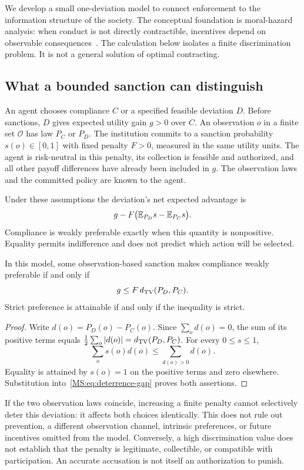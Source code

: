 We develop a small one-deviation model to connect enforcement to the information structure of the society. The conceptual foundation is moral-hazard analysis: when conduct is not directly contractible, incentives depend on observable consequences~\cite{MS:holmstrom1979}. The calculation below isolates a finite discrimination problem. It is not a general solution of optimal contracting.

\subsection{What a bounded sanction can distinguish}
An agent chooses compliance $C$ or a specified feasible deviation $D$. Before sanctions, $D$ gives expected utility gain $g>0$ over $C$. An observation $o$ in a finite set $\mathcal O$ has law $P_C$ or $P_D$. The institution commits to a sanction probability $s(o)\in[0,1]$ with fixed penalty $F>0$, measured in the same utility units. The agent is risk-neutral in this penalty, its collection is feasible and authorized, and all other payoff differences have already been included in $g$. The observation laws and the committed policy are known to the agent.

Under these assumptions the deviation's net expected advantage is
\begin{equation}\label{MS:eq:deterrence-gap}
g-F\bigl(\mathbb E_{P_D}s-\mathbb E_{P_C}s\bigr).
\end{equation}
Compliance is weakly preferable exactly when this quantity is nonpositive. Equality permits indifference and does not predict which action will be selected.

\begin{MSproposition}\label{MS:prop:deterrence-tv}
In this model, some observation-based sanction makes compliance weakly preferable if and only if
\[
g\leq F\,d_{\mathrm{TV}}(P_D,P_C).
\]
Strict preference is attainable if and only if the inequality is strict.
\end{MSproposition}
\begin{proof}
Write $d(o)=P_D(o)-P_C(o)$. Since $\sum_o d(o)=0$, the sum of its positive terms equals $\frac12\sum_o|d(o)|=d_{\mathrm{TV}}(P_D,P_C)$. For every $0\leq s\leq1$,
\[
\sum_o s(o)d(o)\leq\sum_{d(o)>0}d(o).
\]
Equality is attained by $s(o)=1$ on the positive terms and zero elsewhere. Substitution into~\eqref{MS:eq:deterrence-gap} proves both assertions.
\end{proof}

If the two observation laws coincide, increasing a finite penalty cannot selectively deter this deviation: it affects both choices identically. This does not rule out prevention, a different observation channel, intrinsic preferences, or future incentives omitted from the model. Conversely, a high discrimination value does not establish that the penalty is legitimate, collectible, or compatible with participation. An accurate accusation is not itself an authorization to punish.

